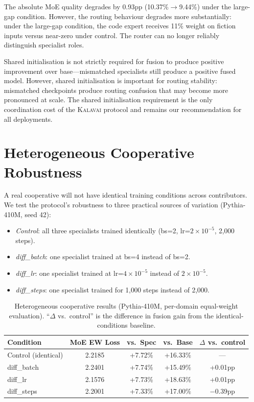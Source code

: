 \documentclass{article}
\newcommand{\kalavai}{\textsc{Kalavai}\xspace}
\begin{document}
The absolute MoE quality degrades by 0.93pp (10.37\%$\rightarrow$9.44\%) under the large-gap condition. However, the routing behaviour degrades more substantially: under the large-gap condition, the code expert receives 11\% weight on fiction inputs versus near-zero under control. The router can no longer reliably distinguish specialist roles.

Shared initialisation is not strictly required for fusion to produce positive improvement over base---mismatched specialists still produce a positive fused model. However, shared initialisation is important for routing stability: mismatched checkpoints produce routing confusion that may become more pronounced at scale. The shared initialisation requirement is the only coordination cost of the \kalavai protocol and remains our recommendation for all deployments.

\section{Heterogeneous Cooperative Robustness}
\label{app:heterogeneous}

A real cooperative will not have identical training conditions across contributors. We test the protocol's robustness to three practical sources of variation (Pythia-410M, seed 42):

\begin{itemize}[leftmargin=*, itemsep=1pt]
  \item \emph{Control}: all three specialists trained identically (bs=2, lr=$2\times10^{-5}$, 2,000 steps).
  \item \emph{diff\_batch}: one specialist trained at bs=4 instead of bs=2.
  \item \emph{diff\_lr}: one specialist trained at lr=$4\times10^{-5}$ instead of $2\times10^{-5}$.
  \item \emph{diff\_steps}: one specialist trained for 1,000 steps instead of 2,000.
\end{itemize}

\begin{table}[h]
\centering
\caption{Heterogeneous cooperative results (Pythia-410M, per-domain equal-weight evaluation). ``$\Delta$ vs.\ control'' is the difference in fusion gain from the identical-conditions baseline.}
\label{tab:heterogeneous}
\small
\begin{tabular}{lcccc}
\toprule
\textbf{Condition} & \textbf{MoE EW Loss} & \textbf{vs.\ Spec} & \textbf{vs.\ Base} & \textbf{$\Delta$ vs.\ control} \\
\midrule
Control (identical)  & 2.2185 & +7.72\% & +16.33\% & --- \\
diff\_batch          & 2.2401 & +7.74\% & +15.49\% & +0.01pp \\
diff\_lr             & 2.1576 & +7.73\% & +18.63\% & +0.01pp \\
diff\_steps          & 2.2001 & +7.33\% & +17.00\% & $-$0.39pp \\
\bottomrule
\end{tabular}
\end{table}
\end{document}
